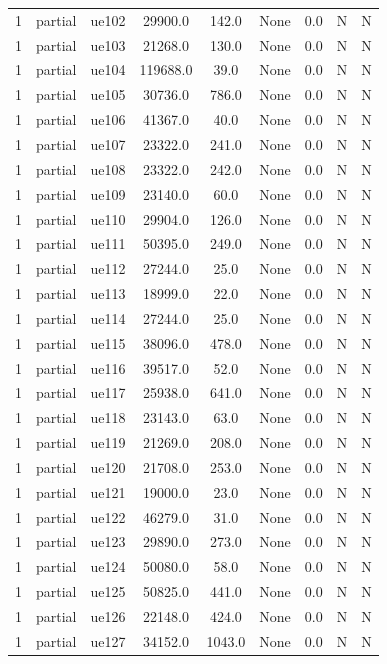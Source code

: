 \begin{table}[ht]
\begin{tabular}{|c|c|c|c|c|c|c|c|c|}
1 & partial & ue102 & 29900.0 & 142.0 & None & 0.0 & N & N \\
1 & partial & ue103 & 21268.0 & 130.0 & None & 0.0 & N & N \\
1 & partial & ue104 & 119688.0 & 39.0 & None & 0.0 & N & N \\
1 & partial & ue105 & 30736.0 & 786.0 & None & 0.0 & N & N \\
1 & partial & ue106 & 41367.0 & 40.0 & None & 0.0 & N & N \\
1 & partial & ue107 & 23322.0 & 241.0 & None & 0.0 & N & N \\
1 & partial & ue108 & 23322.0 & 242.0 & None & 0.0 & N & N \\
1 & partial & ue109 & 23140.0 & 60.0 & None & 0.0 & N & N \\
1 & partial & ue110 & 29904.0 & 126.0 & None & 0.0 & N & N \\
1 & partial & ue111 & 50395.0 & 249.0 & None & 0.0 & N & N \\
1 & partial & ue112 & 27244.0 & 25.0 & None & 0.0 & N & N \\
1 & partial & ue113 & 18999.0 & 22.0 & None & 0.0 & N & N \\
1 & partial & ue114 & 27244.0 & 25.0 & None & 0.0 & N & N \\
1 & partial & ue115 & 38096.0 & 478.0 & None & 0.0 & N & N \\
1 & partial & ue116 & 39517.0 & 52.0 & None & 0.0 & N & N \\
1 & partial & ue117 & 25938.0 & 641.0 & None & 0.0 & N & N \\
1 & partial & ue118 & 23143.0 & 63.0 & None & 0.0 & N & N \\
1 & partial & ue119 & 21269.0 & 208.0 & None & 0.0 & N & N \\
1 & partial & ue120 & 21708.0 & 253.0 & None & 0.0 & N & N \\
1 & partial & ue121 & 19000.0 & 23.0 & None & 0.0 & N & N \\
1 & partial & ue122 & 46279.0 & 31.0 & None & 0.0 & N & N \\
1 & partial & ue123 & 29890.0 & 273.0 & None & 0.0 & N & N \\
1 & partial & ue124 & 50080.0 & 58.0 & None & 0.0 & N & N \\
1 & partial & ue125 & 50825.0 & 441.0 & None & 0.0 & N & N \\
1 & partial & ue126 & 22148.0 & 424.0 & None & 0.0 & N & N \\
1 & partial & ue127 & 34152.0 & 1043.0 & None & 0.0 & N & N \\

\end{tabular}
\end{table}
